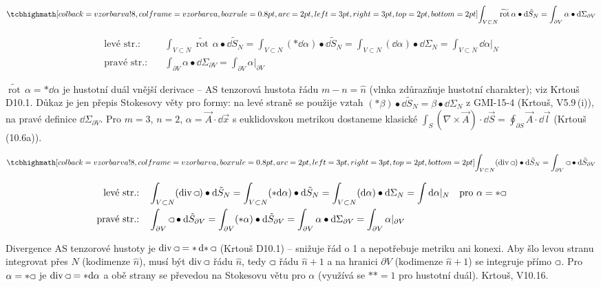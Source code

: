\begin{veta}
\[
  \vzorec{\int_{V\subset N}\widetilde{\operatorname{rot}}\,\alpha\bullet\dd\tilde S_N = \int_{\partial V}\alpha\bullet\dd\Sigma_{\partial V}}
\]
\end{veta}
\begin{align*}
  \text{levé str.:}\quad &\int_{V\subset N}\widetilde{\operatorname{rot}}\,\alpha\bullet\dd\tilde S_N
   = \int_{V\subset N}({*}\dd\alpha)\bullet\dd\tilde S_N
   = \int_{V\subset N}(\dd\alpha)\bullet\dd\Sigma_N
   = \int_{V\subset N}\dd\alpha|_N \\
  \text{pravé str.:}\quad &\int_{\partial V}\alpha\bullet\dd\Sigma_{\partial V} = \int_{\partial V}\alpha|_{\partial V}
\end{align*}

\begin{vysvetleni}
$\widetilde{\operatorname{rot}}\,\alpha={*}\dd\alpha$ je hustotní duál vnější derivace -- AS tenzorová hustota řádu $m-n=\hat n$ (vlnka zdůrazňuje hustotní charakter); viz Krtouš D10.1. Důkaz je jen přepis Stokesovy věty pro formy: na levé straně se použije vztah $({*}\beta)\bullet\dd\tilde S_N=\beta\bullet\dd\Sigma_N$ z GMI-15-4 (Krtouš, V5.9\,(i)), na pravé definice $\dd\Sigma_{\partial V}$. Pro $m=3$, $n=2$, $\alpha=\vec A\cdot\dd\vec x$ s euklidovskou metrikou dostaneme klasické $\int_S(\nabla\times\vec A)\cdot\dd\vec S=\oint_{\partial S}\vec A\cdot\dd\vec l$ (Krtouš (10.6a)).
\end{vysvetleni}

\begin{veta}
\[
  \vzorec{\int_{V\subset N}(\operatorname{div}\gmIpatnactHust)\bullet\dd\tilde S_N = \int_{\partial V}\gmIpatnactHust\bullet\dd\tilde S_{\partial V}}
\]
\end{veta}
\begin{align*}
  \text{levé str.:}\quad &\int_{V\subset N}(\operatorname{div}\gmIpatnactHust)\bullet\dd\tilde S_N
   = \int_{V\subset N}({*}\dd\alpha)\bullet\dd\tilde S_N
   = \int_{V\subset N}(\dd\alpha)\bullet\dd\Sigma_N
   = \int\dd\alpha|_N
   && \text{pro } \alpha = {*}\gmIpatnactHust \\
  \text{pravé str.:}\quad &\int_{\partial V}\gmIpatnactHust\bullet\dd\tilde S_{\partial V}
   = \int_{\partial V}({*}\alpha)\bullet\dd\tilde S_{\partial V}
   = \int_{\partial V}\alpha\bullet\dd\Sigma_{\partial V}
   = \int_{\partial V}\alpha|_{\partial V}
\end{align*}

\begin{vysvetleni}
Divergence AS tenzorové hustoty je $\operatorname{div}\gmIpatnactHust={*}\dd{*}\gmIpatnactHust$ (Krtouš D10.1) -- snižuje řád o 1 a nepotřebuje metriku ani konexi. Aby šlo levou stranu integrovat přes $N$ (kodimenze $\hat n$), musí být $\operatorname{div}\gmIpatnactHust$ řádu $\hat n$, tedy $\gmIpatnactHust$ řádu $\hat n+1$ a na hranici $\partial V$ (kodimenze $\hat n+1$) se integruje přímo $\gmIpatnactHust$. Pro $\alpha={*}\gmIpatnactHust$ je $\operatorname{div}\gmIpatnactHust={*}\dd\alpha$ a obě strany se převedou na Stokesovu větu pro $\alpha$ (využívá se ${*}{*}=1$ pro hustotní duál). Krtouš, V10.16.
\end{vysvetleni}

